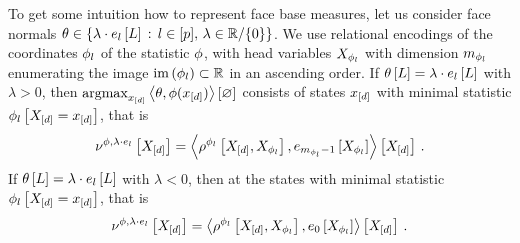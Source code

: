 \begin{example}
    To get some intuition how to represent face base measures, let us consider face normals $\theta\in\{\lambda\cdot e_{l}\left[L\right] \, : \, l\in[p], \, \lambda\in\mathbb{R}/\{0\}\}$.
    We use relational encodings of the coordinates $\phi_{l}$ of the statistic $\phi$, with head variables $X_{\phi_{l}}$ with dimension $m_{\phi_{l}}$ enumerating the image $\mathrm{im}\left(\phi_{l}\right)\subset\mathbb{R}$ in an ascending order.
    If $\theta\left[L\right]=\lambda\cdot e_{l}\left[L\right]$ with $\lambda>0$, then $\mathrm{argmax}_{x_{[d]}} \left\langle \theta,\phi(x_{[d]})\right\rangle \left[ \varnothing \right]$ consists of states $x_{[d]}$ with minimal statistic $\phi_{l}\left[X_{[d]}=x_{[d]}\right]$, that is
    \[  \nu^{\phi,\lambda\cdot e_{l}}\left[X_{[d]}\right]
    = \left\langle \rho^{\phi_{l}}\left[X_{[d]},X_{\phi_{l}}\right],
        e_{m_{\phi_{l}}-1}\left[X_{\phi_{l}}\right]\right\rangle \left[ X_{[d]} \right]  \, . \]
    If $\theta\left[L\right]=\lambda\cdot e_{l}\left[L\right]$ with $\lambda<0$, then at the states with minimal statistic $\phi_{l}\left[X_{[d]}=x_{[d]}\right]$, that is
    \[  \nu^{\phi,\lambda\cdot e_{l}}\left[X_{[d]}\right]
    = \left\langle \rho^{\phi_{l}}\left[X_{[d]},X_{\phi_{l}}\right],
        e_{0}\left[X_{\phi_{l}}\right]\right\rangle \left[ X_{[d]} \right]  \, . \]
\end{example}


